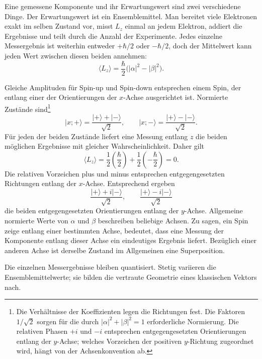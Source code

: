 Eine gemessene Komponente und ihr Erwartungswert sind zwei verschiedene Dinge. Der Erwartungswert ist ein Ensemblemittel. Man bereitet viele Elektronen exakt im selben Zustand vor, misst \(L_z\) einmal an jedem Elektron, addiert die Ergebnisse und teilt durch die Anzahl der Experimente. Jedes einzelne Messergebnis ist weiterhin entweder \(+\hbar/2\) oder \(-\hbar/2\), doch der Mittelwert kann jeden Wert zwischen diesen beiden annehmen:
\begin{equation}
\langle L_z\rangle
=
\frac{\hbar}{2}\bigl(|\alpha|^2-|\beta|^2\bigr).
\end{equation}

Gleiche Amplituden für Spin-up und Spin-down entsprechen einem Spin, der entlang einer der Orientierungen der \(x\)-Achse ausgerichtet ist. Normierte Zustände sind\footnote{Die Verhältnisse der Koeffizienten legen die Richtungen fest. Die Faktoren \(1/\sqrt2\) sorgen für die durch \( |\alpha|^2+|\beta|^2=1\) erforderliche Normierung. Die relativen Phasen \(+i\) und \(-i\) entsprechen entgegengesetzten Orientierungen entlang der \(y\)-Achse; welches Vorzeichen der positiven \(y\)-Richtung zugeordnet wird, hängt von der Achsenkonvention ab.}
\begin{equation}
\lvert x;+\rangle
=
\frac{\lvert+\rangle+\lvert-\rangle}{\sqrt2},
\qquad
\lvert x;-\rangle
=
\frac{\lvert+\rangle-\lvert-\rangle}{\sqrt2}.
\end{equation}
Für jeden der beiden Zustände liefert eine Messung entlang \(z\) die beiden möglichen Ergebnisse mit gleicher Wahrscheinlichkeit. Daher gilt
\begin{equation}
\langle L_z\rangle
=
\frac12\left(\frac{\hbar}{2}\right)
+
\frac12\left(-\frac{\hbar}{2}\right)
=0.
\end{equation}
Die relativen Vorzeichen plus und minus entsprechen entgegengesetzten Richtungen entlang der \(x\)-Achse. Entsprechend ergeben
\begin{equation}
\frac{\lvert+\rangle+i\lvert-\rangle}{\sqrt2},
\qquad
\frac{\lvert+\rangle-i\lvert-\rangle}{\sqrt2}
\end{equation}
die beiden entgegengesetzten Orientierungen entlang der \(y\)-Achse. Allgemeine normierte Werte von \(\alpha\) und \(\beta\) beschreiben beliebige Achsen. Zu sagen, ein Spin zeige entlang einer bestimmten Achse, bedeutet, dass eine Messung der Komponente entlang dieser Achse ein eindeutiges Ergebnis liefert. Bezüglich einer anderen Achse ist derselbe Zustand im Allgemeinen eine Superposition.

Die einzelnen Messergebnisse bleiben quantisiert. Stetig variieren die Ensemblemittelwerte; sie bilden die vertraute Geometrie eines klassischen Vektors nach.


